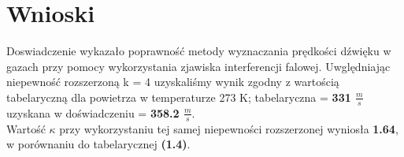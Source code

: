 \documentclass{article}
\begin{document}
\section{Wnioski}

Doswiadczenie wykazało poprawność metody wyznaczania prędkości dźwięku w gazach przy pomocy wykorzystania zjawiska interferencji falowej.
Uwględniając niepewność rozszerzoną k = 4 uzyskaliśmy wynik zgodny z wartością tabelaryczną dla powietrza w temperaturze 273 K;
tabelaryczna = \textbf{331 $\frac{m}{s}$} uzyskana w doświadczeniu = \textbf{\textbf{358.2} $\frac{m}{s}$}. 
\\
Wartość $\kappa$ przy wykorzystaniu tej samej niepewności rozszerzonej wyniosła \textbf{1.64}, w porównaniu do tabelarycznej \textbf{(1.4)}.






\end{document}
